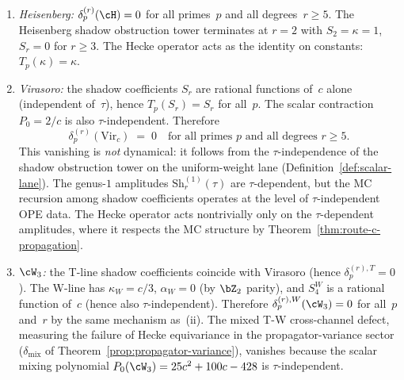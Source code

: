 \begin{proposition}%
\label{prop:hecke-defect-families}%
%
%
\begin{enumerate}[label=\textup{(\roman*)}]
\item \emph{Heisenberg:}
 $\delta_p^{(r)}(\cH) = 0$ for all primes~$p$ and all
 degrees~$r \ge 5$. The Heisenberg shadow obstruction tower terminates at
 $r = 2$ with $S_2 = \kappa = 1$, $S_r = 0$ for
 $r \ge 3$. The Hecke operator acts as the identity on
 constants: $T_p(\kappa) = \kappa$.

\item \emph{Virasoro:}
 the shadow coefficients $S_r$ are rational functions
 of~$c$ alone \textup{(}independent of~$\tau$\textup{)},
 hence $T_p(S_r) = S_r$ for all~$p$. The scalar contraction
 $P_0 = 2/c$ is also $\tau$-independent. Therefore
 \begin{equation}\label{eq:hecke-defect-virasoro-vanishes}
 \delta_p^{(r)}(\mathrm{Vir}_c) \;=\; 0
 \quad\text{for all primes $p$ and all degrees $r \ge 5$.}
 \end{equation}
 This vanishing is \emph{not} dynamical: it follows from the
 $\tau$-independence of the shadow obstruction tower on the uniform-weight lane
 (Definition~\ref{def:scalar-lane}).
 The genus-$1$ amplitudes $\mathrm{Sh}_r^{(1)}(\tau)$ are
 $\tau$-dependent, but the MC recursion among shadow
 coefficients operates at the level of $\tau$-independent
 OPE data. The Hecke operator acts nontrivially only on
 the $\tau$-dependent amplitudes, where it respects the MC
 structure by Theorem~\textup{\ref{thm:route-c-propagation}}.

\item \emph{$\cW_3$:}
 the T-line shadow coefficients coincide with Virasoro
 \textup{(}hence $\delta_p^{(r),T} = 0$\textup{)}. The
 W-line has $\kappa_W = c/3$, $\alpha_W = 0$ \textup{(}by
 $\bZ_2$ parity\textup{)}, and $S_4^W$ is a rational function
 of~$c$ \textup{(}hence also $\tau$-independent\textup{)}.
 Therefore $\delta_p^{(r),W}(\cW_3) = 0$ for all~$p$ and~$r$
 by the same mechanism as~\textup{(ii)}.
 The mixed T-W cross-channel defect, measuring the failure
 of Hecke equivariance in the propagator-variance
 sector \textup{(}$\delta_{\mathrm{mix}}$ of
 Theorem~\textup{\ref{prop:propagator-variance}}\textup{)},
 vanishes because the scalar mixing polynomial
 $P_0(\cW_3) = 25c^2 + 100c - 428$ is $\tau$-independent.
\end{enumerate}
\end{proposition}

